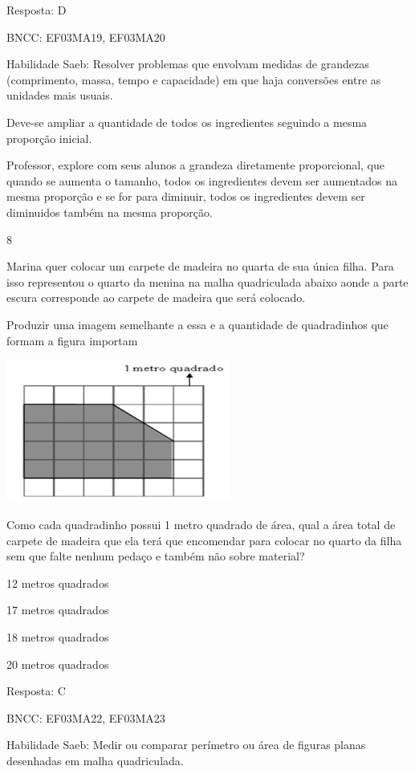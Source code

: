 \begin{escolha}
\begin{escolha}
Resposta: D

BNCC: EF03MA19, EF03MA20

Habilidade Saeb: Resolver problemas que envolvam medidas de grandezas
(comprimento, massa, tempo e capacidade) em que haja conversões entre as
unidades mais usuais.

Deve-se ampliar a quantidade de todos os ingredientes seguindo a mesma
proporção inicial.

Professor, explore com seus alunos a grandeza diretamente proporcional,
que quando se aumenta o tamanho, todos os ingredientes devem ser
aumentados na mesma proporção e se for para diminuir, todos os
ingredientes devem ser diminuidos também na mesma proporção.

\num{8}

Marina quer colocar um carpete de madeira no quarta de sua única filha.
Para isso representou o quarto da menina na malha quadriculada abaixo
aonde a parte escura corresponde ao carpete de madeira que será
colocado.

Produzir uma imagem semelhante a essa e a quantidade de quadradinhos que
formam a figura importam

\includegraphics[width=2.90385in,height=1.84662in]{media/image123.png}

Como cada quadradinho possui 1 metro quadrado de área, qual a área total
de carpete de madeira que ela terá que encomendar para colocar no quarto
da filha sem que falte nenhum pedaço e também não sobre material?

\begin{escolha}
\item
  12 metros quadrados
\item
  17 metros quadrados
\item
  18 metros quadrados
\item
  20 metros quadrados
\end{escolha}

Resposta: C

BNCC: EF03MA22, EF03MA23

Habilidade Saeb: Medir ou comparar perímetro ou área de figuras planas
desenhadas em malha quadriculada.


\end{escolha}
\end{escolha}
